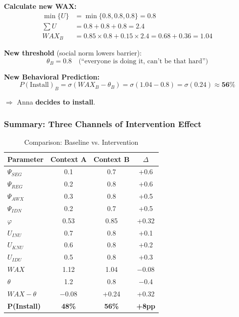 \textbf{Calculate new WAX:}
\begin{align}
\min\{U\} &= \min\{0.8, 0.8, 0.8\} = 0.8 \\
\sum U &= 0.8 + 0.8 + 0.8 = 2.4 \\
WAX_B &= 0.85 \times 0.8 + 0.15 \times 2.4 = 0.68 + 0.36 = \mathbf{1.04}
\end{align}

\textbf{New threshold} (social norm lowers barrier):
\begin{equation}
\theta_B = 0.8 \quad \text{(``everyone is doing it, can't be that hard'')}
\end{equation}

\textbf{New Behavioral Prediction:}
\begin{equation}
P(\text{Install})_B = \sigma(WAX_B - \theta_B) = \sigma(1.04 - 0.8) = \sigma(0.24) \approx \mathbf{56\%}
\end{equation}

$\Rightarrow$ Anna \textbf{decides to install}.

\subsubsection{Summary: Three Channels of Intervention Effect}

\begin{table}[htbp]
\centering
\caption{Comparison: Baseline vs. Intervention}
\renewcommand{\arraystretch}{1.1}
\begin{tabular}{@{}lccc@{}}
\toprule
\textbf{Parameter} & \textbf{Context A} & \textbf{Context B} & \textbf{$\Delta$} \\
\midrule
$\Psi_{SEG}$ & 0.1 & 0.7 & +0.6 \\
$\Psi_{REG}$ & 0.2 & 0.8 & +0.6 \\
$\Psi_{AWX}$ & 0.3 & 0.8 & +0.5 \\
$\Psi_{IDN}$ & 0.2 & 0.7 & +0.5 \\
\midrule
$\varphi$ & 0.53 & 0.85 & +0.32 \\
\midrule
$U_{INU}$ & 0.7 & 0.8 & +0.1 \\
$U_{KNU}$ & 0.6 & 0.8 & +0.2 \\
$U_{IDU}$ & 0.5 & 0.8 & +0.3 \\
\midrule
$WAX$ & 1.12 & 1.04 & $-$0.08 \\
$\theta$ & 1.2 & 0.8 & $-$0.4 \\
$WAX - \theta$ & $-$0.08 & +0.24 & +0.32 \\
\midrule
\textbf{P(Install)} & \textbf{48\%} & \textbf{56\%} & \textbf{+8pp} \\
\bottomrule
\end{tabular}
\end{table}

